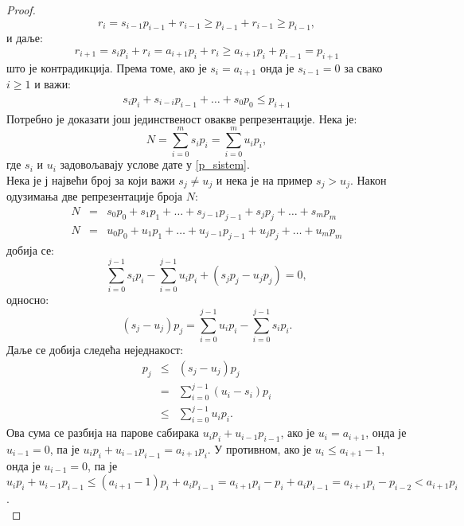 \documentclass[a4paper]{article}
\begin{document}
\begin{proof}
		\begin{displaymath}
			r_{i} = s_{i-1}p_{i-1} + r_{i-1} \geq p_{i-1} + r_{i-1} \geq p_{i-1},
		\end{displaymath}
	и даље:
		\begin{displaymath}
			r_{i+1} = s_{i}p_{i} + r_{i} = a_{i+1}p_{i} + r_{i} \geq a_{i+1}p_{i} + p_{i-1} = p_{i+1}
		\end{displaymath}
	што је контрадикција. Према томе, ако је $ s_{i} = a_{i+1} $ онда је $ s_{i-1} = 0 $ за свако $ i \ge 1 $ и важи:	
		\begin{eqnarray}
			\label{nejednakost} s_{i}p_{i} + s_{i-i}p_{i-1} + \ldots + s_{0}p_{0} \le p_{i+1}
		\end{eqnarray}
	Потребно је доказати још јединственост овакве репрезентације. Нека је:	
		\begin{displaymath}
			N = \sum_{i=0}^{m} s_{i}p_{i}  = \sum_{i=0}^{m} u_{i}p_{i},
		\end{displaymath}	
	где $ s_{i} $ и $ u_{i} $ задовољавају услове дате у \eqref{p_sistem}.\\
	Нека је $ ј $ највећи број за који важи $ s_{j} \neq u_{j} $ и нека је на пример $ s_{j} > u_{j} $. 
	Након одузимања две репрезентације броја $ N $:
		\begin{eqnarray*}
			N &=& s_{0}p_{0} + s_{1}p_{1} + \ldots + s_{j-1}p_{j-1} + s_{j}p_{j} + \ldots + s_{m}p_{m}\\		
			N &=& u_{0}p_{0} + u_{1}p_{1} + \ldots + u_{j-1}p_{j-1} + u_{j}p_{j} + \ldots + u_{m}p_{m}
		\end{eqnarray*}	
	добија се:	
		\begin{displaymath}
			\sum_{i=0}^{j-1} s_{i}p_{i} - \sum_{i=0}^{j-1} u_{i}p_{i} + (s_{j}p_{j}  - u_{j}p_{j}) = 0,
		\end{displaymath}
	односно:
		\begin{displaymath}
			(s_{j} - u_{j})p_{j} = \sum_{i=0}^{j-1} u_{i}p_{i} - \sum_{i=0}^{j-1} s_{i}p_{i}.
		\end{displaymath}
	Даље се добија следећа неједнакост:
		\begin{eqnarray*}
			p_{j} &\leq& (s_{j} - u_{j})p_{j}\\
			&=& \sum_{i=0}^{j-1} (u_{i} - s_{i})p_{i}\\
			&\leq& \sum_{i=0}^{j-1} u_{i}p_{i}.
		\end{eqnarray*}
	Ова сума се разбија на парове сабирака $ u_{i}p_{i} + u_{i-1}p_{i-1} $, ако је $ u_{i} = a_{i+1} $, онда је $ u_{i-1} = 0 $, па је $ u_{i}p_{i} + u_{i-1}p_{i-1} = a_{i+1}p_{i} $. У противном, ако је $ u_{i} \le a_{i+1} - 1 $, онда је $ u_{i-1} = 0 $, па је $ u_{i}p_{i} + u_{i-1}p_{i-1} \le (a_{i+1} - 1)p_{i} + a_{i}p_{i-1} = a_{i+1}p_{i} - p_{i} + a_{i}p_{i-1} = a_{i+1}p_{i} - p_{i-2} < a_{i+1}p_{i} $.\\

\end{proof}
\end{document}
